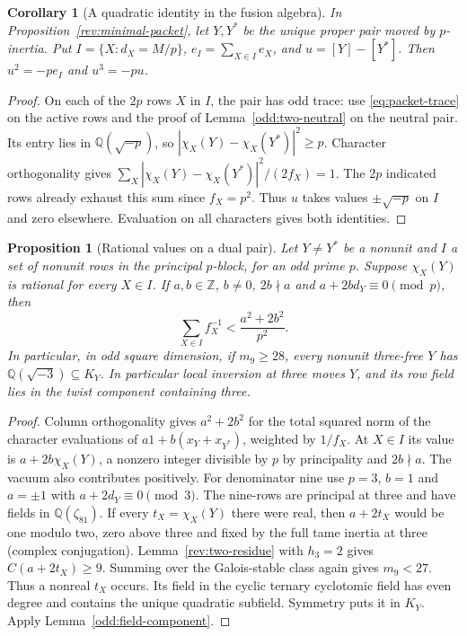 \documentclass[11pt]{amsart}
\numberwithin{equation}{section}
\newtheorem{proposition}[theorem]{Proposition}
\newtheorem{corollary}[theorem]{Corollary}
\theoremstyle{definition}
\theoremstyle{plain}
\newcommand{\QQ}{\mathbb Q}
\newcommand{\ZZ}{\mathbb Z}
\begin{document}
\begin{corollary}[A quadratic identity in the fusion algebra]\label{new:packet-square}
In Proposition~\ref{rev:minimal-packet}, let $Y,Y^*$ be the unique
proper pair moved by $p$-inertia. Put $I=\{X:d_X=M/p\}$,
$e_I=\sum_{X\in I}e_X$, and $u=[Y]-[Y^*]$. Then
$u^2=-p e_I$ and $u^3=-pu$.
\end{corollary}
\begin{proof}
On each of the $2p$ rows $X$ in $I$, the pair has odd trace:
use \eqref{eq:packet-trace} on the active rows and the proof of
Lemma~\ref{odd:two-neutral} on the neutral pair.
Its entry lies in $\QQ(\sqrt{-p})$, so
$|\chi_X(Y)-\chi_X(Y^*)|^2\ge p$. Character orthogonality gives
$\sum_X|\chi_X(Y)-\chi_X(Y^*)|^2/(2f_X)=1$. The $2p$ indicated
rows already exhaust this sum since $f_X=p^2$. Thus $u$ takes
values $\pm\sqrt{-p}$ on $I$ and zero elsewhere. Evaluation on all
characters gives both identities.
\end{proof}



\begin{proposition}[Rational values on a dual pair]\label{rev:rational-pair}
Let $Y\ne Y^*$ be a nonunit and $I$ a set of nonunit rows in the
principal $p$-block, for an odd prime $p$. Suppose $\chi_X(Y)$ is
rational for every $X\in I$. If $a,b\in\ZZ$, $b\ne0$, $2b\nmid a$
and $a+2b d_Y\equiv0\pmod p$, then
\[
                \sum_{X\in I} f_X^{-1}<\frac{a^2+2b^2}{p^2}.
\]
In particular, in odd square dimension, if $m_9\ge28$, every
nonunit three-free $Y$ has $\QQ(\sqrt{-3})\subseteq K_Y$. In particular
local inversion at three moves $Y$, and its row field lies in the
twist component containing three.
\end{proposition}
\begin{proof}
Column orthogonality gives $a^2+2b^2$ for the total squared norm
of the character evaluations of $a1+b(x_Y+x_{Y^*})$, weighted by
$1/f_X$. At $X\in I$ its value is $a+2b\chi_X(Y)$, a nonzero
integer divisible by $p$ by principality and $2b\nmid a$. The
vacuum also contributes positively. For denominator nine use $p=3$,
$b=1$ and $a=\pm1$ with $a+2d_Y\equiv0\pmod3$. The nine-rows are principal at three and have fields in $\QQ(\zeta_{81})$.
If every $t_X=\chi_X(Y)$ there were real, then $a+2t_X$ would be
one modulo two, zero above three and fixed by the full tame inertia
at three (complex conjugation). Lemma~\ref{rev:two-residue} with
$h_3=2$ gives $C(a+2t_X)\ge9$. Summing over the Galois-stable
class again gives $m_9<27$. Thus a nonreal $t_X$ occurs. Its field
in the cyclic ternary cyclotomic field has even degree and contains
the unique quadratic subfield. Symmetry puts it in $K_Y$. Apply
Lemma~\ref{odd:field-component}.
\end{proof}
\end{document}
